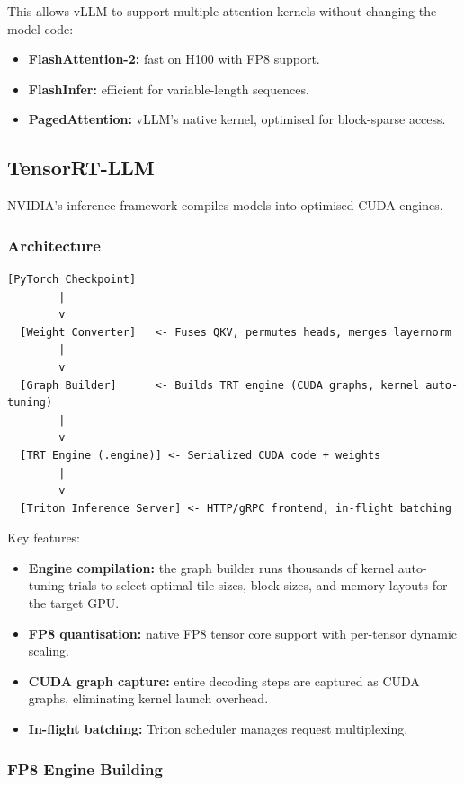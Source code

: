 \documentclass[11pt,a4paper]{article}
\theoremstyle{definition}
\begin{document}
This allows vLLM to support multiple attention kernels without changing the model code:
\begin{itemize}
	\item \textbf{FlashAttention-2:} fast on H100 with FP8 support.
	\item \textbf{FlashInfer:} efficient for variable-length sequences.
	\item \textbf{PagedAttention:} vLLM's native kernel, optimised for block-sparse access.
\end{itemize}

\subsection{TensorRT-LLM}

NVIDIA's inference framework compiles models into optimised CUDA engines.

\subsubsection{Architecture}

\begin{lstlisting}[caption=TensorRT-LLM workflow]
  [PyTorch Checkpoint]
        |
        v
  [Weight Converter]   <- Fuses QKV, permutes heads, merges layernorm
        |
        v
  [Graph Builder]      <- Builds TRT engine (CUDA graphs, kernel auto-tuning)
        |
        v
  [TRT Engine (.engine)] <- Serialized CUDA code + weights
        |
        v
  [Triton Inference Server] <- HTTP/gRPC frontend, in-flight batching
\end{lstlisting}

Key features:
\begin{itemize}
	\item \textbf{Engine compilation:} the graph builder runs thousands of kernel auto-tuning trials to select optimal tile sizes, block sizes, and memory layouts for the target GPU.
	\item \textbf{FP8 quantisation:} native FP8 tensor core support with per-tensor dynamic scaling.
	\item \textbf{CUDA graph capture:} entire decoding steps are captured as CUDA graphs, eliminating kernel launch overhead.
	\item \textbf{In-flight batching:} Triton scheduler manages request multiplexing.
\end{itemize}

\subsubsection{FP8 Engine Building}
\end{document}

